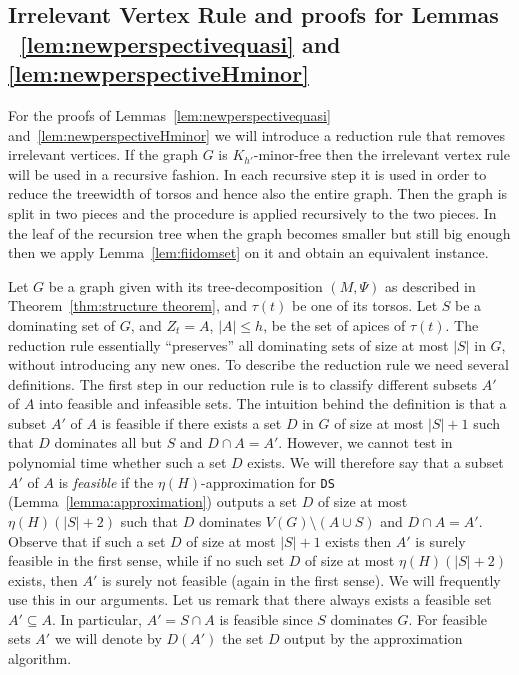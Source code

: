 \documentclass[11pt]{article}
\newcommand{\tDS}{{\texttt{\sc DS}}}
\begin{document}
\subsection{Irrelevant Vertex Rule and proofs for  Lemmas ~\ref{lem:newperspectivequasi} and \ref{lem:newperspectiveHminor}}
For the proofs of  Lemmas~\ref{lem:newperspectivequasi} and~\ref{lem:newperspectiveHminor} we will introduce a reduction rule that removes irrelevant vertices. 
If the graph $G$ is $K_{h'}$-minor-free then the irrelevant vertex rule  will be used in a recursive fashion. 
In each recursive step it is used in order to reduce the treewidth of torsos and hence also the entire graph. Then the graph 
is split in two pieces and the procedure is applied recursively to the two pieces. In the leaf of the recursion tree when the graph becomes 
smaller but still big enough then we apply Lemma~\ref{lem:fiidomset} on it and obtain an equivalent instance. 




Let $G$ be  a graph given with its  tree-decomposition $(M,\Psi)$ 
as described in Theorem~\ref{thm:structure theorem}, and $\tau(t)$ be one of its torsos. Let $S$ be a dominating set of $G$, and $Z_t=A$, $|A|\leq h$, be the set of apices of $\tau(t)$. The reduction rule essentially ``preserves'' all dominating sets of size at most $|S|$ in $G$, without introducing any new ones. 
To describe the reduction rule we need several definitions. 
The first step in our reduction rule is to classify different subsets $A'$ of $A$ into feasible and infeasible sets. The intuition behind the definition is that a subset $A'$ of $A$ is feasible if there exists a set $D$ in $G$ of size at most $|S|+1$  such that $D$ dominates all but $S$ and   $D \cap A = A'$. However, we cannot test in polynomial time whether such a set $D$ exists. We will therefore say that a subset $A'$ of $A$ is {\em feasible} if the $\eta(H)$-approximation for \tDS \, (Lemma~\ref{lemma:approximation}) 
outputs a set $D$ of size at most $\eta(H)(|S|+2)$ such that $D$  dominates $V(G) \setminus (A \cup S)$ and $D \cap A = A'$. Observe that if such a set $D$ of size at most $|S|+1$ exists then $A'$ is surely feasible in the first sense, while if no such set $D$ of size at most $\eta(H)(|S|+2)$ exists, then $A'$ is surely not feasible (again in the first sense). We will frequently use this in our arguments. Let us remark that there always exists a feasible set $A' \subseteq A$. In particular, $A' = S \cap A$ is feasible since $S$ dominates $G$. For feasible sets $A'$ we will denote by $D(A')$ the set $D$ output by the approximation algorithm.
\end{document}
